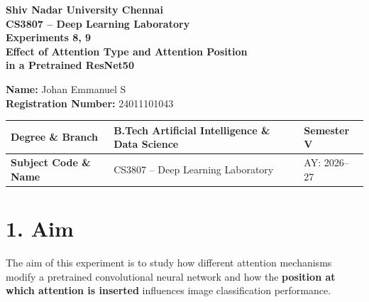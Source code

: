 \documentclass[10pt]{article}
\begin{document}

\begin{center}

{\large\textbf{Shiv Nadar University Chennai}}\\[2mm]

{\normalsize\textbf{CS3807 -- Deep Learning Laboratory}}\\[2mm]

{\large\textbf{Experiments 8, 9}}\\[1mm]

{\normalsize
\textbf{
Effect of Attention Type and Attention Position\\
in a Pretrained ResNet50
}}

\end{center}

\begin{flushleft}
\textbf{Name:} Johan Emmanuel S\\
\textbf{Registration Number:} 24011101043\\
\end{flushleft}

\vspace{3mm}


\begin{center}
\begin{tabular}{|p{3.5cm}|p{8.7cm}|p{2.1cm}|}
\hline
\textbf{Degree \& Branch}
&
B.Tech Artificial Intelligence \& Data Science
&
Semester V
\\
\hline

\textbf{Subject Code \& Name}
&
CS3807 -- Deep Learning Laboratory
&
AY: 2026--27
\\
\hline
\end{tabular}
\end{center}

\section*{1. Aim}

The aim of this experiment is to study how different attention mechanisms
modify a pretrained convolutional neural network and how the
\textbf{position at which attention is inserted} influences image
classification performance.
\end{document}
